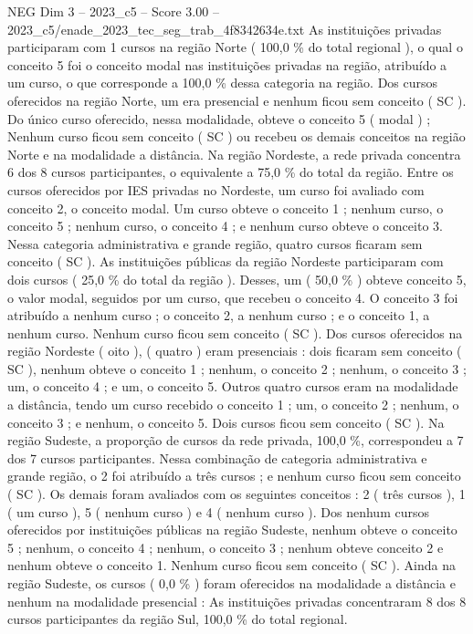\begin{textsample}{NEG Dim 3 – 2023\_c5 – Score 3.00 – 2023\_c5/enade\_2023\_tec\_seg\_trab\_4f8342634e.txt}
As instituições privadas participaram com 1 cursos na região Norte ( 100,0 \% do total regional ), o qual o conceito 5 foi o conceito modal nas instituições privadas na região, atribuído a um curso, o que corresponde a 100,0 \% dessa categoria na região.
Dos cursos oferecidos na região Norte, um era presencial e nenhum ficou sem conceito ( SC ).
Do único curso oferecido, nessa modalidade, obteve o conceito 5 ( modal ) ; Nenhum curso ficou sem conceito ( SC ) ou recebeu os demais conceitos na região Norte e na modalidade a distância.
Na região Nordeste, a rede privada concentra 6 dos 8 cursos participantes, o equivalente a 75,0 \% do total da região.
Entre os cursos oferecidos por IES privadas no Nordeste, um curso foi avaliado com conceito 2, o conceito modal.
Um curso obteve o conceito 1 ; nenhum curso, o conceito 5 ; nenhum curso, o conceito 4 ; e nenhum curso obteve o conceito 3.
Nessa categoria administrativa e grande região, quatro cursos ficaram sem conceito ( SC ).
As instituições públicas da região Nordeste participaram com dois cursos ( 25,0 \% do total da região ).
Desses, um ( 50,0 \% ) obteve conceito 5, o valor modal, seguidos por um curso, que recebeu o conceito 4.
O conceito 3 foi atribuído a nenhum curso ; o conceito 2, a nenhum curso ; e o conceito 1, a nenhum curso.
Nenhum curso ficou sem conceito ( SC ).
Dos cursos oferecidos na região Nordeste ( oito ), ( quatro ) eram presenciais : dois ficaram sem conceito ( SC ), nenhum obteve o conceito 1 ; nenhum, o conceito 2 ; nenhum, o conceito 3 ; um, o conceito 4 ; e um, o conceito 5.
Outros quatro cursos eram na modalidade a distância, tendo um curso recebido o conceito 1 ; um, o conceito 2 ; nenhum, o conceito 3 ; e nenhum, o conceito 5.
Dois cursos ficou sem conceito ( SC ).
Na região Sudeste, a proporção de cursos da rede privada, 100,0 \%, correspondeu a 7 dos 7 cursos participantes.
Nessa combinação de categoria administrativa e grande região, o 2 foi atribuído a três cursos ; e nenhum curso ficou sem conceito ( SC ).
Os demais foram avaliados com os seguintes conceitos : 2 ( três cursos ), 1 ( um curso ), 5 ( nenhum curso ) e 4 ( nenhum curso ).
Dos nenhum cursos oferecidos por instituições públicas na região Sudeste, nenhum obteve o conceito 5 ; nenhum, o conceito 4 ; nenhum, o conceito 3 ; nenhum obteve conceito 2 e nenhum obteve o conceito 1.
Nenhum curso ficou sem conceito ( SC ).
Ainda na região Sudeste, os cursos ( 0,0 \% ) foram oferecidos na modalidade a distância e nenhum na modalidade presencial : As instituições privadas concentraram 8 dos 8 cursos participantes da região Sul, 100,0 \% do total regional.

\end{textsample}
